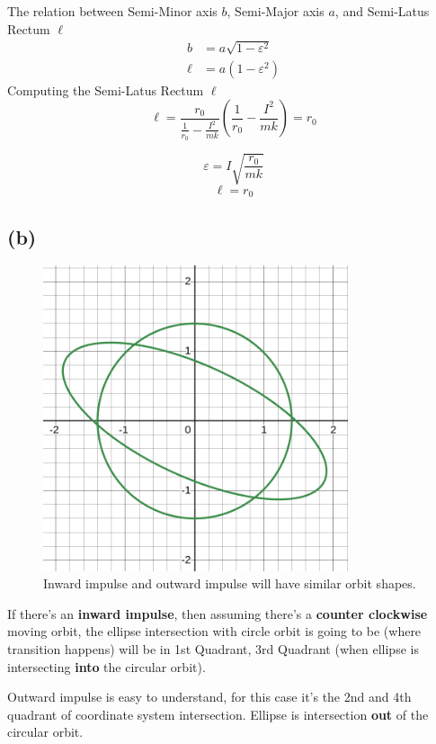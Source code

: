 \documentclass[letter, 10pts]{article}
\begin{document}
The relation between Semi-Minor axis $b$, Semi-Major axis $a$, and Semi-Latus Rectum $\ell $
\begin{align*}
	b &= a \sqrt{1 - \varepsilon^2} 
	\\
	\ell &= a(1 - \varepsilon^2)
\end{align*}
Computing the Semi-Latus Rectum $\ell$
\[
\ell = \frac{r_0}{\frac{1}{r_0} - \frac{I^2}{m k }} \left(
\frac{1}{r_0} - \frac{I^2}{ m k} \right) = r_0
\] 

\[
\boxed{
\varepsilon = 
I \sqrt{\frac{r_0}{m k }} 
}
\] 
\[
\boxed{
\ell = r_0
}
\] 



\subsection*{(b)} 
\begin{figure}[H]
	\centering
	\includegraphics[width=0.8\textwidth]{./ss/8/5.png}
	\caption{Inward impulse and outward impulse will have similar orbit shapes.}
	\label{fig:-ss-8-5-png}
\end{figure}
If there's an \textbf{inward impulse}, then assuming there's a \textbf{counter clockwise} moving orbit, the ellipse intersection with circle orbit is going to be (where transition happens) will be in 1st Quadrant, 3rd Quadrant (when ellipse is intersecting \textbf{into} the circular orbit). 

Outward impulse is easy to understand, for this case it's the 2nd and 4th quadrant of coordinate system intersection. Ellipse is intersection \textbf{out} of the circular orbit.
\end{document}
